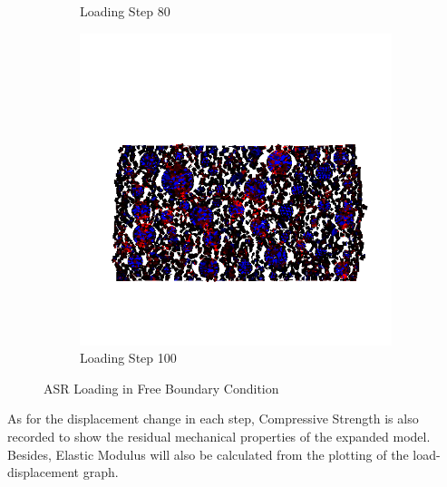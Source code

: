 \begin{figure}[ht]
\begin{subfigure}{.33\textwidth}
      \caption{Loading Step 80}
      \end{subfigure}%
      \begin{subfigure}{.33\textwidth}
        \centering
        \includegraphics[width=1.0\linewidth]{Files/A30P75_3_IS_Free/DEP50-STEP(120).png}
        \caption{Loading Step 100}
      \end{subfigure}

      

  \caption{ASR Loading in Free Boundary Condition}
  \label{fig:ASR_Loading_free}
\end{figure}


As for the displacement change in each step, Compressive Strength is also recorded to show the residual mechanical properties of the expanded model. Besides, Elastic Modulus will also be calculated from the plotting of the load-displacement graph.

\clearpage










